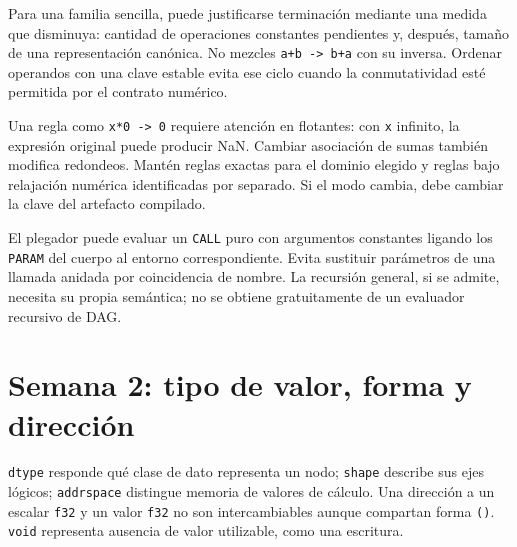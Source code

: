 \documentclass[12pt,a4paper,oneside]{report}
\begin{document}
Para una familia sencilla, puede justificarse terminación mediante una medida que disminuya: cantidad de operaciones constantes pendientes y, después, tamaño de una representación canónica. No mezcles \texttt{a+b -> b+a} con su inversa. Ordenar operandos con una clave estable evita ese ciclo cuando la conmutatividad esté permitida por el contrato numérico.

Una regla como \texttt{x*0 -> 0} requiere atención en flotantes: con \texttt{x} infinito, la expresión original puede producir NaN. Cambiar asociación de sumas también modifica redondeos. Mantén reglas exactas para el dominio elegido y reglas bajo relajación numérica identificadas por separado. Si el modo cambia, debe cambiar la clave del artefacto compilado.

El plegador puede evaluar un \texttt{CALL} puro con argumentos constantes ligando los \texttt{PARAM} del cuerpo al entorno correspondiente. Evita sustituir parámetros de una llamada anidada por coincidencia de nombre. La recursión general, si se admite, necesita su propia semántica; no se obtiene gratuitamente de un evaluador recursivo de DAG.

\section{Semana 2: tipo de valor, forma y dirección}
\texttt{dtype} responde qué clase de dato representa un nodo; \texttt{shape} describe sus ejes lógicos; \texttt{addrspace} distingue memoria de valores de cálculo. Una dirección a un escalar \texttt{f32} y un valor \texttt{f32} no son intercambiables aunque compartan forma \texttt{()}. \texttt{void} representa ausencia de valor utilizable, como una escritura.
\end{document}
